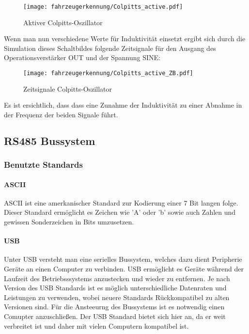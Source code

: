 \begin{figure}[H]
    \centering
    \texttt{[image: fahrzeugerkennung/Colpitts\_active.pdf]}
    \caption{Aktiver Colpitts-Oszillator}
\end{figure}

Wenn man nun verschiedene Werte für Induktivität einsetzt ergibt sich durch die Simulation dieses Schaltbildes folgende Zeitsignale für den Ausgang des Operationsverstärker OUT und der Spannung SINE:

\begin{figure}[H]
    \centering
    \texttt{[image: fahrzeugerkennung/Colpitts\_active\_ZB.pdf]}
    \caption{Zeitsignale Colpitts-Oszillator}
\end{figure}

Es ist ersichtlich, dass dass eine Zunahme der Induktivität zu einer Abnahme in der Frequenz der beiden Signale führt.
\pagebreak
\subsection{RS485 Bussystem}
\subsubsection{Benutzte Standards}
\paragraph{ASCII}\mbox{}

ASCII ist eine amerkanischer Standard zur Kodierung einer 7 Bit langen folge. Dieser Standard ermöglicht es Zeichen wie 'A' oder 'b' sowie auch Zahlen und gewissen Sonderzeichen in Bits umzusetzen. 
\paragraph{USB}\mbox{}

Unter USB versteht man eine serielles Bussystem, welches dazu dient Peripherie Geräte an einen Computer zu verbinden. USB ermöglicht es Geräte während der Laufzeit des Betriebsssystems anzustecken und wieder zu entfernen.
Je nach Version des USB Standards ist es möglich unterschiedliche Datenraten und Leistungen zu verwenden, wobei neuere Standards Rückkompatibel zu alten Versionen sind. Für die Ansteeurng des Bussystems ist es notwendig einen Comupter anzuschließen. 
Der USB Standard bietet sich hier an, da er weit verbreitet ist und daher mit vielen Computern kompatibel ist.


